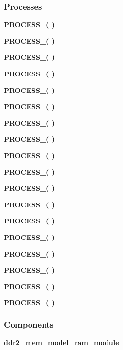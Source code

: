 \subsubsection*{Processes}
 \begin{DoxyCompactItemize}
\item 
{\bf P\+R\+O\+C\+E\+S\+S\+\_}{\bfseries  (  )}
\item 
{\bf P\+R\+O\+C\+E\+S\+S\+\_}{\bfseries  (  )}
\item 
{\bf P\+R\+O\+C\+E\+S\+S\+\_}{\bfseries  (  )}
\item 
{\bf P\+R\+O\+C\+E\+S\+S\+\_}{\bfseries  (  )}
\item 
{\bf P\+R\+O\+C\+E\+S\+S\+\_}{\bfseries  (  )}
\item 
{\bf P\+R\+O\+C\+E\+S\+S\+\_}{\bfseries  (  )}
\item 
{\bf P\+R\+O\+C\+E\+S\+S\+\_}{\bfseries  (  )}
\item 
{\bf P\+R\+O\+C\+E\+S\+S\+\_}{\bfseries  (  )}
\item 
{\bf P\+R\+O\+C\+E\+S\+S\+\_}{\bfseries  (  )}
\item 
{\bf P\+R\+O\+C\+E\+S\+S\+\_}{\bfseries  (  )}
\item 
{\bf P\+R\+O\+C\+E\+S\+S\+\_}{\bfseries  (  )}
\item 
{\bf P\+R\+O\+C\+E\+S\+S\+\_}{\bfseries  (  )}
\item 
{\bf P\+R\+O\+C\+E\+S\+S\+\_}{\bfseries  (  )}
\item 
{\bf P\+R\+O\+C\+E\+S\+S\+\_}{\bfseries  (  )}
\item 
{\bf P\+R\+O\+C\+E\+S\+S\+\_}{\bfseries  (  )}
\item 
{\bf P\+R\+O\+C\+E\+S\+S\+\_}{\bfseries  (  )}
\item 
{\bf P\+R\+O\+C\+E\+S\+S\+\_}{\bfseries  (  )}
\item 
{\bf P\+R\+O\+C\+E\+S\+S\+\_}{\bfseries  (  )}
\end{DoxyCompactItemize}
\subsubsection*{Components}
 \begin{DoxyCompactItemize}
\item 
{\bf ddr2\+\_\+mem\+\_\+model\+\_\+ram\+\_\+module}  {\bfseries }  
\end{DoxyCompactItemize}
